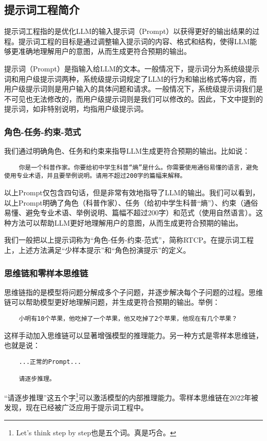 \documentclass[../main.tex]{subfiles}
\begin{document}
\subsection{提示词工程简介}

提示词工程指的是优化LLM的输入提示词（Prompt）以获得更好的输出结果的过程。提示词工程的目标是通过调整输入提示词的内容、格式和结构，使得LLM能够更准确地理解用户的意图，从而生成更符合预期的输出。

提示词（Prompt）是指输入给LLM的文本。一般情况下，提示词分为系统级提示词和用户级提示词两种，系统级提示词规定了LLM的行为和输出格式等内容，而用户级提示词则是用户输入的具体问题和请求。一般情况下，系统级提示词我们是不可见也无法修改的，而用户级提示词则是我们可以修改的。因此，下文中提到的提示词，如非特别说明，均指用户级提示词。

\subsubsection{角色-任务-约束-范式}

我们通过明确角色、任务和约束来指导LLM生成更符合预期的输出。比如说：

\begin{lstlisting}
    你是一个科普作家。你要给初中学生科普“熵”是什么。你需要使用通俗易懂的语言，避免使用专业术语，并且要举例说明。请用不超过200字的篇幅来解释。
\end{lstlisting}

以上Prompt仅包含四句话，但是非常有效地指导了LLM的输出。我们可以看到，以上Prompt明确了角色（科普作家）、任务（给初中学生科普“熵”）、约束（通俗易懂、避免专业术语、举例说明、篇幅不超过200字）和范式（使用自然语言）。这种方法可以帮助LLM更好地理解用户的意图，从而生成更符合预期的输出。

我们一般把以上提示词称为“角色-任务-约束-范式”，简称RTCP。在提示词工程上，上述方法满足“少样本提示”和“角色扮演提示”的定义。

\subsubsection{思维链和零样本思维链}

思维链指的是模型将问题分解成多个子问题，并逐步解决每个子问题的过程。思维链可以帮助模型更好地理解问题，并生成更符合预期的输出。举例：

\begin{lstlisting}
    小明有10个苹果，他吃掉了一个苹果，他又吃掉了2个苹果，他现在有几个苹果？
\end{lstlisting}

这样手动加入思维链可以显著增强模型的推理能力。另一种方式是零样本思维链，也就是说：
\begin{lstlisting}
    ...正常的Prompt...

    请逐步推理。
\end{lstlisting}
“请逐步推理”这五个字\footnote{Let's think step by step也是五个词。真是巧合。}可以激活模型的内部推理能力。零样本思维链在2022年被发现，现在已经被广泛应用于提示词工程中。
\end{document}
